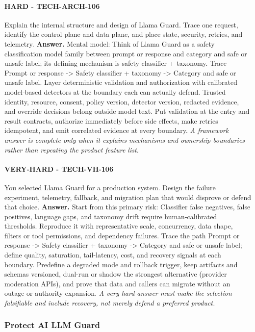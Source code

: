 \paragraph{HARD - TECH-ARCH-106} Explain the internal structure and design of Llama Guard. Trace one request, identify the control plane and data plane, and place state, security, retries, and telemetry.
\textbf{Answer.} Mental model: Think of Llama Guard as a safety classification model family between prompt or response and category and safe or unsafe label; its defining mechanism is safety classifier + taxonomy. Trace Prompt or response -> Safety classifier + taxonomy -> Category and safe or unsafe label. Layer deterministic validation and authorization with calibrated model-based detectors at the boundary each can actually defend. Trusted identity, resource, consent, policy version, detector version, redacted evidence, and override decisions belong outside model text. Put validation at the entry and result contracts, authorize immediately before side effects, make retries idempotent, and emit correlated evidence at every boundary.
\textit{A framework answer is complete only when it explains mechanisms and ownership boundaries rather than repeating the product feature list.}
\paragraph{VERY-HARD - TECH-VH-106} You selected Llama Guard for a production system. Design the failure experiment, telemetry, fallback, and migration plan that would disprove or defend that choice.
\textbf{Answer.} Start from this primary risk: Classifier false negatives, false positives, language gaps, and taxonomy drift require human-calibrated thresholds. Reproduce it with representative scale, concurrency, data shape, filters or tool permissions, and dependency failures. Trace the path Prompt or response -> Safety classifier + taxonomy -> Category and safe or unsafe label; define quality, saturation, tail-latency, cost, and recovery signals at each boundary. Predefine a degraded mode and rollback trigger, keep artifacts and schemas versioned, dual-run or shadow the strongest alternative (provider moderation APIs), and prove that data and callers can migrate without an outage or authority expansion.
\textit{A very-hard answer must make the selection falsifiable and include recovery, not merely defend a preferred product.}
\subsubsection*{Protect AI LLM Guard}
